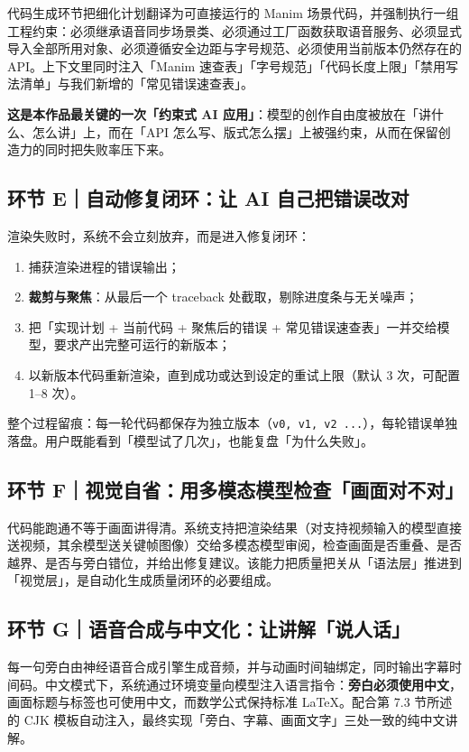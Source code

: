 \documentclass[11pt,a4paper]{ctexart}
\begin{document}
代码生成环节把细化计划翻译为可直接运行的 Manim 场景代码，并强制执行一组工程约束：必须继承语音同步场景类、必须通过工厂函数获取语音服务、必须显式导入全部所用对象、必须遵循安全边距与字号规范、必须使用当前版本仍然存在的 API。上下文里同时注入「Manim 速查表」「字号规范」「代码长度上限」「禁用写法清单」与我们新增的「常见错误速查表」。

\textbf{这是本作品最关键的一次「约束式 AI 应用」}：模型的创作自由度被放在「讲什么、怎么讲」上，而在「API 怎么写、版式怎么摆」上被强约束，从而在保留创造力的同时把失败率压下来。

\subsection{环节 E｜自动修复闭环：让 AI 自己把错误改对}

渲染失败时，系统不会立刻放弃，而是进入修复闭环：

\begin{enumerate}
  \item 捕获渲染进程的错误输出；
  \item \textbf{裁剪与聚焦}：从最后一个 traceback 处截取，剔除进度条与无关噪声；
  \item 把「实现计划 + 当前代码 + 聚焦后的错误 + 常见错误速查表」一并交给模型，要求产出完整可运行的新版本；
  \item 以新版本代码重新渲染，直到成功或达到设定的重试上限（默认 3 次，可配置 1--8 次）。
\end{enumerate}

整个过程留痕：每一轮代码都保存为独立版本（\texttt{v0, v1, v2 ...}），每轮错误单独落盘。用户既能看到「模型试了几次」，也能复盘「为什么失败」。

\subsection{环节 F｜视觉自省：用多模态模型检查「画面对不对」}

代码能跑通不等于画面讲得清。系统支持把渲染结果（对支持视频输入的模型直接送视频，其余模型送关键帧图像）交给多模态模型审阅，检查画面是否重叠、是否越界、是否与旁白错位，并给出修复建议。该能力把质量把关从「语法层」推进到「视觉层」，是自动化生成质量闭环的必要组成。

\subsection{环节 G｜语音合成与中文化：让讲解「说人话」}

每一句旁白由神经语音合成引擎生成音频，并与动画时间轴绑定，同时输出字幕时间码。中文模式下，系统通过环境变量向模型注入语言指令：\textbf{旁白必须使用中文}，画面标题与标签也可使用中文，而数学公式保持标准 LaTeX。配合第 7.3 节所述的 CJK 模板自动注入，最终实现「旁白、字幕、画面文字」三处一致的纯中文讲解。
\end{document}
